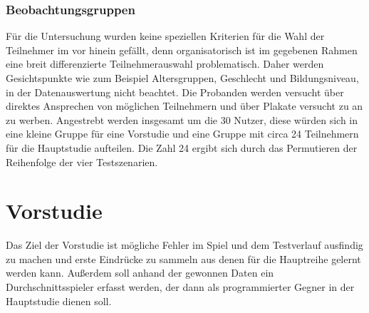 \subsection{Beobachtungsgruppen}
Für die Untersuchung wurden keine speziellen Kriterien für die Wahl der Teilnehmer im vor hinein gefällt, denn organisatorisch ist im gegebenen Rahmen eine breit differenzierte Teilnehmerauswahl problematisch. Daher werden Gesichtspunkte wie zum Beispiel Altersgruppen, Geschlecht und Bildungsniveau, in der Datenauswertung nicht beachtet. Die Probanden werden versucht über direktes Ansprechen von möglichen Teilnehmern  und über Plakate versucht zu an zu werben. Angestrebt werden insgesamt um die 30 Nutzer, diese würden sich in eine kleine Gruppe für eine Vorstudie und eine Gruppe mit circa 24 Teilnehmern für die Hauptstudie aufteilen. Die Zahl 24 ergibt sich durch das Permutieren der Reihenfolge der vier Testszenarien.

\chapter{Vorstudie}
Das Ziel der Vorstudie ist mögliche Fehler im Spiel und dem Testverlauf ausfindig zu machen und erste Eindrücke zu sammeln aus denen für die Hauptreihe gelernt werden kann. Außerdem soll anhand der gewonnen Daten ein Durchschnittsspieler erfasst werden, der dann als programmierter Gegner in der Hauptstudie dienen soll.
